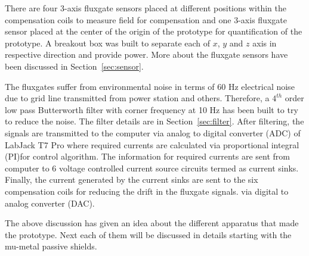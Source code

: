 There are four 3-axis fluxgate sensors placed at different positions within the compensation coils to measure field for compensation and one 3-axis fluxgate sensor placed at the center of the origin of the prototype for quantification of the prototype. A breakout box was built to separate each of $x$, $y$ and $z$ axis in respective direction and provide power. More about the fluxgate sensors have been discussed in Section~\ref{sec:sensor}.



\FloatBarrier
\clearpage
The fluxgates suffer from environmental noise in terms of 60 Hz electrical noise due to grid line transmitted from power station and others. Therefore, a $4^{th}$ order low pass Butterworth filter with corner frequency at 10 Hz has been built to try to reduce the noise. The filter details are in Section~\ref{sec:filter}. After filtering, the signals are transmitted to the computer via analog to digital converter (ADC) of LabJack T7 Pro where required currents are calculated via proportional integral (PI)for control algorithm. The information for required currents are sent from computer to 6 voltage controlled current source circuits termed as current sinks. Finally, the current generated by the current sinks are sent to the six compensation coils for reducing the drift in the fluxgate signals.  via digital to analog converter (DAC).

The above discussion  has given an idea about the different apparatus that made the prototype. Next each of them will be discussed in details starting with  the mu-metal passive shields.

